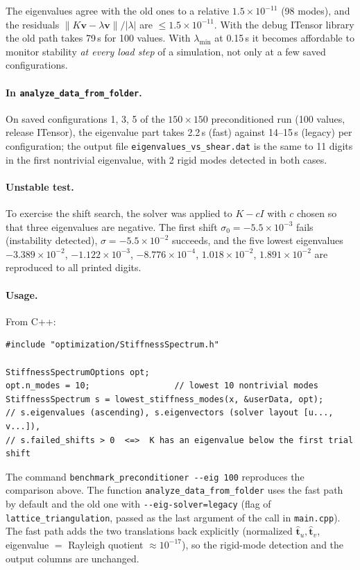 \documentclass[11pt,a4paper]{article}
\theoremstyle{remark}
\newcommand{\code}[1]{\texttt{#1}}
\begin{document}
The eigenvalues agree with the old ones to a relative $1.5\times10^{-11}$ (98 modes), and the
residuals $\|K\bm v-\lambda\bm v\|/|\lambda|$ are $\le1.5\times10^{-11}$. With the debug ITensor
library the old path takes 79\,s for 100 values. With $\lambda_{\min}$ at 0.15\,s it becomes
affordable to monitor stability \emph{at every load step} of a simulation, not only at a few saved
configurations.

\paragraph{In \code{analyze\_\allowbreak{}data\_\allowbreak{}from\_\allowbreak{}folder}.} On saved configurations 1, 3, 5 of
the $150\times150$ preconditioned run (100 values, release ITensor), the eigenvalue part takes
2.2\,s (fast) against 14--15\,s (legacy) per configuration; the output file
\code{eigenvalues\_\allowbreak{}vs\_\allowbreak{}shear.dat} is the same to 11 digits in the first nontrivial
eigenvalue, with 2 rigid modes detected in both cases.

\paragraph{Unstable test.} To exercise the shift search, the solver was applied to
$K-cI$ with $c$ chosen so that three eigenvalues are negative. The first shift
$\sigma_0=-5.5\times10^{-3}$ fails (instability detected), $\sigma=-5.5\times10^{-2}$ succeeds, and
the five lowest eigenvalues $-3.389\times10^{-2}$, $-1.122\times10^{-3}$, $-8.776\times10^{-4}$,
$1.018\times10^{-2}$, $1.891\times10^{-2}$ are reproduced to all printed digits.

\paragraph{Usage.} From C++:
\begin{lstlisting}
#include "optimization/StiffnessSpectrum.h"

StiffnessSpectrumOptions opt;
opt.n_modes = 10;                 // lowest 10 nontrivial modes
StiffnessSpectrum s = lowest_stiffness_modes(x, &userData, opt);
// s.eigenvalues (ascending), s.eigenvectors (solver layout [u..., v...]),
// s.failed_shifts > 0  <=>  K has an eigenvalue below the first trial shift
\end{lstlisting}
The command \code{benchmark\_\allowbreak{}preconditioner -{}-eig\allowbreak{} 100} reproduces the comparison above.
The function \code{analyze\_\allowbreak{}data\_\allowbreak{}from\_\allowbreak{}folder} uses the fast path by default and the old
one with \code{-{}-eig-\allowbreak{}solver=\allowbreak{}legacy} (flag of \code{lattice\_\allowbreak{}triangulation}, passed as the last
argument of the call in \code{main.cpp}). The fast path adds the two translations back
explicitly (normalized $\hat{\bm t}_u,\hat{\bm t}_v$, eigenvalue $=$ Rayleigh quotient $\approx10^{-17}$), so the
rigid-mode detection and the output columns are unchanged.
\end{document}
